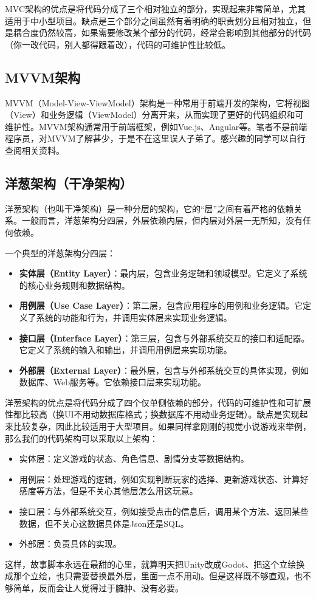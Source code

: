 \documentclass[../main.tex]{subfiles}
\begin{document}
MVC架构的优点是将代码分成了三个相对独立的部分，实现起来非常简单，尤其适用于中小型项目。缺点是三个部分之间虽然有着明确的职责划分且相对独立，但是耦合度仍然较高，如果需要修改某个部分的代码，经常会影响到其他部分的代码（你一改代码，别人都得跟着改），代码的可维护性比较低。

\subsection{MVVM架构}
MVVM（Model-View-ViewModel）架构是一种常用于前端开发的架构，它将视图（View）和业务逻辑（ViewModel）分离开来，从而实现了更好的代码组织和可维护性。MVVM架构通常用于前端框架，例如Vue.js、Angular等。笔者不是前端程序员，对MVVM了解甚少，于是不在这里误人子弟了。感兴趣的同学可以自行查阅相关资料。

\subsection{洋葱架构（干净架构）}

洋葱架构（也叫干净架构）是一种分层的架构，它的“层”之间有着严格的依赖关系。一般而言，洋葱架构分四层，外层依赖内层，但内层对外层一无所知，没有任何依赖。

一个典型的洋葱架构分四层：
\begin{itemize}
    \item \textbf{实体层（Entity Layer）}：最内层，包含业务逻辑和领域模型。它定义了系统的核心业务规则和数据结构。
    \item \textbf{用例层（Use Case Layer）}：第二层，包含应用程序的用例和业务逻辑。它定义了系统的功能和行为，并调用实体层来实现业务逻辑。
    \item \textbf{接口层（Interface Layer）}：第三层，包含与外部系统交互的接口和适配器。它定义了系统的输入和输出，并调用用例层来实现功能。
    \item \textbf{外部层（External Layer）}：最外层，包含与外部系统交互的具体实现，例如数据库、Web服务等。它依赖接口层来实现功能。
\end{itemize}

洋葱架构的优点是将代码分成了四个仅单侧依赖的部分，代码的可维护性和可扩展性都比较高（换UI不用动数据库格式；换数据库不用动业务逻辑）。缺点是实现起来比较复杂，因此比较适用于大型项目。如果同样拿刚刚的视觉小说游戏来举例，那么我们的代码架构可以采取以上架构：
\begin{itemize}
    \item 实体层：定义游戏的状态、角色信息、剧情分支等数据结构。
    \item 用例层：处理游戏的逻辑，例如实现判断玩家的选择、更新游戏状态、计算好感度等方法，但是不关心其他层怎么用这玩意。
    \item 接口层：与外部系统交互，例如接受点击的信息后，调用某个方法、返回某些数据，但不关心这数据具体是Json还是SQL。
    \item 外部层：负责具体的实现。
\end{itemize}
这样，故事脚本永远在最甜的心里，就算明天把Unity改成Godot、把这个立绘换成那个立绘，也只需要替换最外层，里面一点不用动。但是这样既不够直观，也不够简单，反而会让人觉得过于臃肿、没有必要。
\end{document}
